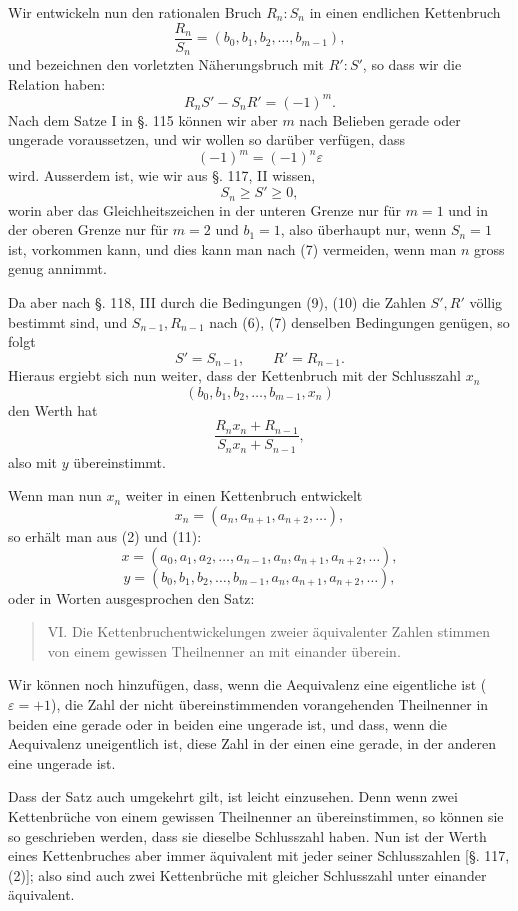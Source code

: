 \documentclass[11pt]{article}
\begin{document}
Wir entwickeln nun den rationalen Bruch $R_n:S_n$ in einen endlichen Kettenbruch
\[
\tag{8}        \frac{R_n}{S_n}=(b_0,b_1,b_2,\ldots,b_{m-1}),
\]
und bezeichnen den vorletzten Näherungsbruch mit $R':S'$, so dass wir die Relation haben:
\[
\tag{9}        R_nS'-S_nR'=(-1)^m.
\]
Nach dem Satze I in §. 115 können wir aber $m$ nach Belieben gerade oder ungerade voraussetzen, und wir wollen so darüber verfügen, dass
\[
        (-1)^m=(-1)^n\varepsilon
\]
wird. Ausserdem ist, wie wir aus §. 117, II wissen,
\[
\tag{10}       S_n\ge S'\ge0,
\]
worin aber das Gleichheitszeichen in der unteren Grenze nur für $m=1$ und in der oberen Grenze nur für $m=2$ und $b_1=1$, also überhaupt nur, wenn $S_n=1$ ist, vorkommen kann, und dies kann man nach (7) vermeiden, wenn man $n$ gross genug annimmt.

Da aber nach §. 118, III durch die Bedingungen (9), (10) die Zahlen $S',R'$ völlig bestimmt sind, und $S_{n-1},R_{n-1}$ nach (6), (7) denselben Bedingungen genügen, so folgt
\[
        S'=S_{n-1},
        \qquad
        R'=R_{n-1}.
\]
Hieraus ergiebt sich nun weiter, dass der Kettenbruch mit der Schlusszahl $x_n$
\[
\tag{11}       (b_0,b_1,b_2,\ldots,b_{m-1},x_n)
\]
den Werth hat
\[
        \frac{R_nx_n+R_{n-1}}{S_nx_n+S_{n-1}},
\]
also mit $y$ übereinstimmt.

Wenn man nun $x_n$ weiter in einen Kettenbruch entwickelt
\[
        x_n=(a_n,a_{n+1},a_{n+2},\ldots),
\]
so erhält man aus (2) und (11):
\[
        x=(a_0,a_1,a_2,\ldots,a_{n-1},a_n,a_{n+1},a_{n+2},\ldots),
\]
\[
        y=(b_0,b_1,b_2,\ldots,b_{m-1},a_n,a_{n+1},a_{n+2},\ldots),
\]
oder in Worten ausgesprochen den Satz:
\begin{quote}
VI. Die Kettenbruchentwickelungen zweier äquivalenter Zahlen stimmen von einem gewissen Theilnenner an mit einander überein.
\end{quote}
Wir können noch hinzufügen, dass, wenn die Aequivalenz eine eigentliche ist ($\varepsilon=+1$), die Zahl der nicht übereinstimmenden vorangehenden Theilnenner in beiden eine gerade oder in beiden eine ungerade ist, und dass, wenn die Aequivalenz uneigentlich ist, diese Zahl in der einen eine gerade, in der anderen eine ungerade ist.

Dass der Satz auch umgekehrt gilt, ist leicht einzusehen. Denn wenn zwei Kettenbrüche von einem gewissen Theilnenner an übereinstimmen, so können sie so geschrieben werden, dass sie dieselbe Schlusszahl haben. Nun ist der Werth eines Kettenbruches aber immer äquivalent mit jeder seiner Schlusszahlen [§. 117, (2)]; also sind auch zwei Kettenbrüche mit gleicher Schlusszahl unter einander äquivalent.
\end{document}
